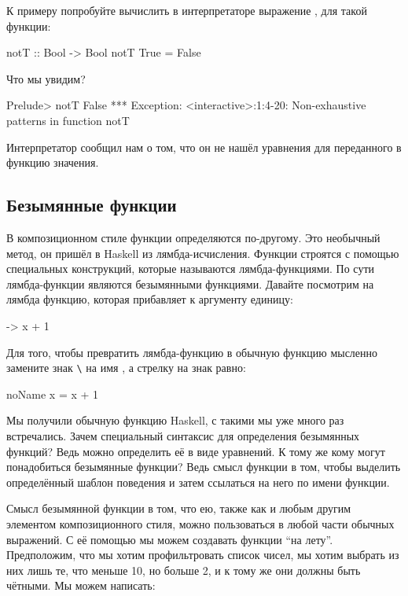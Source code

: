 К примеру попробуйте вычислить в интерпретаторе выражение
, для такой функции:


\begin{code}
notT :: Bool -> Bool
notT True = False
\end{code}

Что мы увидим?


\begin{code}
Prelude> notT False
*** Exception: <interactive>:1:4-20: Non-exhaustive patterns in function notT
\end{code}

Интерпретатор сообщил нам о том, что он не нашёл уравнения для
переданного в функцию значения.

\subsection{Безымянные функции}

В композиционном стиле функции определяются по-другому. Это необычный
метод, он пришёл в Haskell из лямбда-исчисления. Функции строятся с
помощью специальных конструкций, которые называются лямбда-функциями. По
сути лямбда-функции являются безымянными функциями. Давайте посмотрим на
лямбда функцию, которая прибавляет к аргументу единицу:


\begin{code}
\x -> x + 1
\end{code}

Для того, чтобы превратить лямбда-функцию в обычную функцию мысленно
замените знак \In{}\verb!\!\In{} на имя , а стрелку на знак
равно:


\begin{code}
noName x = x + 1
\end{code}

Мы получили обычную функцию Haskell, с такими мы уже много раз
встречались. Зачем специальный синтаксис для определения безымянных
функций? Ведь можно определить её в виде уравнений. К тому же кому могут
понадобиться безымянные функции? Ведь смысл функции в том, чтобы
выделить определённый шаблон поведения и затем ссылаться на него по
имени функции.

Смысл безымянной функции в том, что ею, также как и любым другим
элементом композиционного стиля, можно пользоваться в любой части
обычных выражений. С её помощью мы можем создавать функции ``на лету''.
Предположим, что мы хотим профильтровать список чисел, мы хотим выбрать
из них лишь те, что меньше 10, но больше 2, и к тому же они должны быть
чётными. Мы можем написать:


